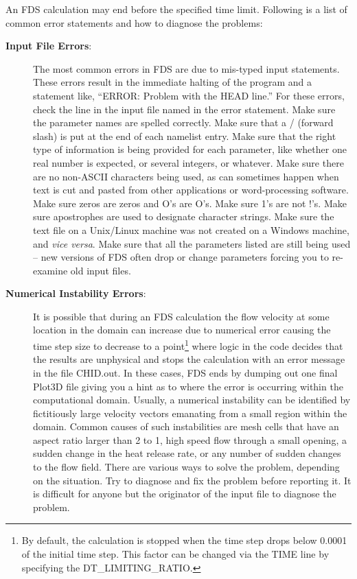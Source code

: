 \documentclass[11pt]{book}
\begin{document}
An FDS calculation may end before the specified time limit. Following is a list of common error statements and how to diagnose the problems:
\begin{description}
\item[{\bf Input File Errors}:] The most common errors in FDS are due to mis-typed input statements. These errors result in the immediate halting of the program and a statement like, ``ERROR: Problem with the HEAD line.'' For these errors, check the line in the input file named in the error statement. Make sure the parameter names are spelled correctly. Make sure that a / (forward slash) is put at the end of each namelist entry. Make sure that the right type of information is being provided for each parameter, like whether one real number is expected, or several integers, or whatever. Make sure there are no non-ASCII characters being used, as can sometimes happen when text is cut and pasted from other applications or word-processing software. Make sure zeros are zeros and O's are O's. Make sure 1's are not !'s. Make sure apostrophes are used to designate character strings. Make sure the text file on a Unix/Linux machine was not created on a Windows machine, and {\em vice versa}. Make sure that all the parameters listed are still being used -- new versions of FDS often drop or change parameters forcing you to re-examine old input files.
\item [{\bf Numerical Instability Errors}:] It is possible that during an FDS calculation the flow velocity at some location in the domain can increase due to numerical error causing the time step size to decrease to a point\footnote{By default, the calculation is stopped when the time step drops below 0.0001 of the initial time step. This factor can be changed via the {\ct TIME} line by specifying the {\ct DT\_LIMITING\_RATIO}.} where logic in the code decides that the results are unphysical and stops the calculation with an error message in the file {\ct CHID.out}. In these cases, FDS ends by dumping out one final Plot3D file giving you a hint as to where the error is occurring within the computational domain. Usually, a numerical instability can be identified by fictitiously large velocity vectors emanating from a small region within the domain. Common causes of such instabilities are mesh cells that have an aspect ratio larger than 2 to 1, high speed flow through a small opening, a sudden change in the heat release rate, or any number of sudden changes to the flow field. There are various ways to solve the problem, depending on the situation. Try to diagnose and fix the problem before reporting it. It is difficult for anyone but the originator of the input file to diagnose the problem.

\end{description}
\end{document}
